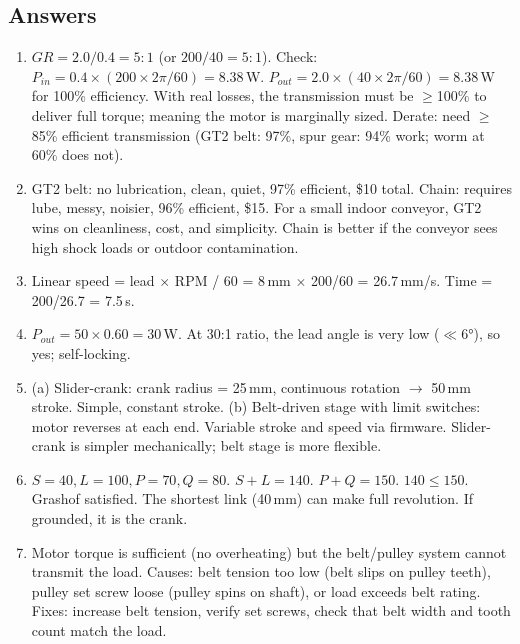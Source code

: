 \subsection{Answers}
\begin{enumerate}[leftmargin=1.5em]
\item $GR = 2.0/0.4 = 5:1$ (or $200/40 = 5:1$). Check: $P_{in} = 0.4 \times (200 \times 2\pi/60) = 8.38$\,W. $P_{out} = 2.0 \times (40 \times 2\pi/60) = 8.38$\,W for 100\% efficiency. With real losses, the transmission must be $\geq$100\% to deliver full torque; meaning the motor is marginally sized. Derate: need $\geq$85\% efficient transmission (GT2 belt: 97\%, spur gear: 94\% work; worm at 60\% does not).
\item GT2 belt: no lubrication, clean, quiet, 97\% efficient, \$10 total. Chain: requires lube, messy, noisier, 96\% efficient, \$15. For a small indoor conveyor, GT2 wins on cleanliness, cost, and simplicity. Chain is better if the conveyor sees high shock loads or outdoor contamination.
\item Linear speed = lead $\times$ RPM / 60 = 8\,mm $\times$ 200/60 = 26.7\,mm/s. Time = 200/26.7 = 7.5\,s.
\item $P_{out} = 50 \times 0.60 = 30$\,W. At 30:1 ratio, the lead angle is very low ($\ll$\ang{6}), so yes; self-locking.
\item (a) Slider-crank: crank radius = 25\,mm, continuous rotation $\to$ 50\,mm stroke. Simple, constant stroke. (b) Belt-driven stage with limit switches: motor reverses at each end. Variable stroke and speed via firmware. Slider-crank is simpler mechanically; belt stage is more flexible.
\item $S = 40, L = 100, P = 70, Q = 80$. $S + L = 140$. $P + Q = 150$. $140 \leq 150$. Grashof satisfied. The shortest link (40\,mm) can make full revolution. If grounded, it is the crank.
\item Motor torque is sufficient (no overheating) but the belt/pulley system cannot transmit the load. Causes: belt tension too low (belt slips on pulley teeth), pulley set screw loose (pulley spins on shaft), or load exceeds belt rating. Fixes: increase belt tension, verify set screws, check that belt width and tooth count match the load.
\end{enumerate}

